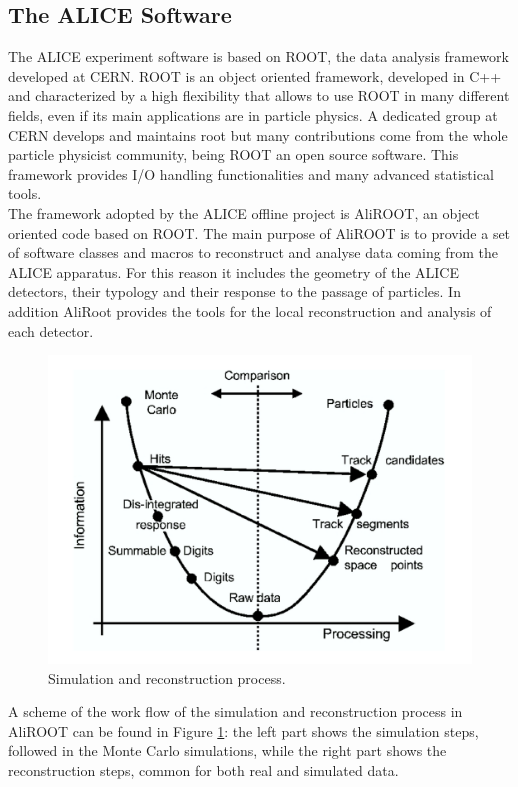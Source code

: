 \subsection{The ALICE Software}
The ALICE experiment software is based on ROOT, the data analysis framework developed at CERN. ROOT is an object oriented framework, developed in C++ and characterized by a high flexibility that allows to use ROOT in many different fields, even if its main applications are in particle physics. A dedicated group at CERN develops and maintains root but many contributions come from the whole particle physicist community, being ROOT an open source software. This framework provides I/O handling functionalities and many advanced statistical tools.\\
The framework adopted by the ALICE offline project is AliROOT, an object oriented code based on ROOT. The main purpose of AliROOT is to provide a set of software classes and macros to reconstruct and analyse data coming from the ALICE apparatus. For this reason it includes the geometry of the ALICE detectors, their typology and their response to the passage of particles. In addition AliRoot provides the tools for the local reconstruction and analysis of each detector.\\
\begin{figure}
  \centering
  \includegraphics[scale=0.30]{figures/reconstruction.png}
  \caption{Simulation and reconstruction process.}
  \label{fig:Rec}
\end{figure}
%
A scheme of the work flow of the simulation and reconstruction process in AliROOT can be found in Figure \ref{fig:Rec}: the left part shows the simulation steps, followed in the Monte Carlo simulations, while the right part shows the reconstruction steps, common for both real and simulated data.\\

